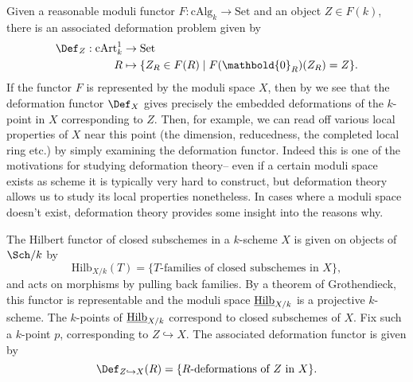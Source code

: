 Given a reasonable moduli functor \(F: \text{cAlg}_k \rightarrow \text{Set}\)
and an object \(Z\in F(k)\), there is an associated deformation problem given by 
\begin{align*}
    \Def_Z: \text{cArt}^1_k &\rightarrow \text{Set} \\ 
    R &\mapsto \{Z_R\in F(R) \;|\; F(\mathbold{0}_R)(Z_R)=Z \}.
\end{align*}
If the functor \(F\) is represented by the moduli space \(X\), then by
 we see that the deformation functor \(\Def_X\)
gives precisely the embedded deformations of the \(k\)-point in \(X\)
corresponding to \(Z\). Then, for example, we can read off various local
properties of \(X\) near this point (the dimension, reducedness, the completed
local ring etc.) by simply examining the deformation functor. Indeed this is
one of the motivations for studying deformation theory-- even if a certain moduli
space exists as scheme it is typically very hard to construct, but deformation
theory allows us to study its local properties nonetheless. In cases where a
moduli space doesn't exist, deformation theory provides some insight into the
reasons why.

\begin{example} 
    The Hilbert functor of closed subschemes in a \(k\)-scheme \(X\) is given on
    objects of \(\Sch/k\) by 
    \[\text{Hilb}_{X/k}(T) = \{\text{\(T\)-families of closed subschemes in
    \(X\)}\},\] 
    and acts on morphisms by pulling back families. By a theorem of
    Grothendieck, this functor is representable and the moduli space
    \(\text{\underline{Hilb}}_{X/k}\) is a projective \(k\)-scheme. The
    \(k\)-points of \(\text{\underline{Hilb}}_{X/k}\) correspond to closed
    subschemes of \(X\).  Fix such a \(k\)-point \(p\), corresponding to
    \(Z\hookrightarrow X\). The associated deformation functor is given by 
    \[\Def_{Z\hookrightarrow X}(R)=\{\text{\(R\)-deformations of \(Z\) in
    \(X\)}\}.\]
\end{example}

